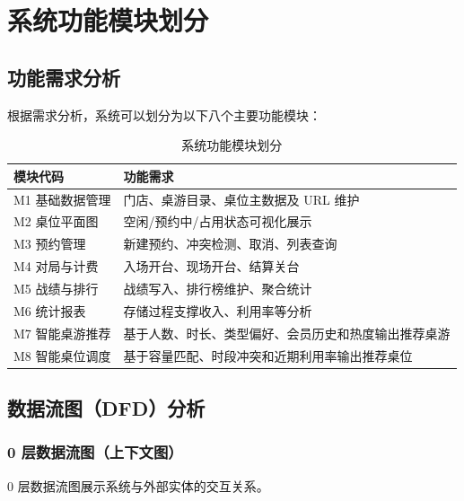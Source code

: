 \chapter{系统功能模块划分}

\section{功能需求分析}

根据需求分析，系统可以划分为以下八个主要功能模块：

\begin{table}[H]
  \centering
  \footnotesize
  \caption{系统功能模块划分}
  \label{tab:modules}
  \begin{tabularx}{\textwidth}{|p{2.5cm}|X|}
    \hline
    \textbf{模块代码} & \textbf{功能需求} \\
    \hline
    M1 基础数据管理 & 门店、桌游目录、桌位主数据及 URL 维护 \\
    \hline
    M2 桌位平面图 & 空闲/预约中/占用状态可视化展示 \\
    \hline
    M3 预约管理 & 新建预约、冲突检测、取消、列表查询 \\
    \hline
    M4 对局与计费 & 入场开台、现场开台、结算关台 \\
    \hline
    M5 战绩与排行 & 战绩写入、排行榜维护、聚合统计 \\
    \hline
    M6 统计报表 & 存储过程支撑收入、利用率等分析 \\
    \hline
    M7 智能桌游推荐 & 基于人数、时长、类型偏好、会员历史和热度输出推荐桌游 \\
    \hline
    M8 智能桌位调度 & 基于容量匹配、时段冲突和近期利用率输出推荐桌位 \\
    \hline
  \end{tabularx}
\end{table}

\section{数据流图（DFD）分析}

\subsection{0 层数据流图（上下文图）}

0 层数据流图展示系统与外部实体的交互关系。

